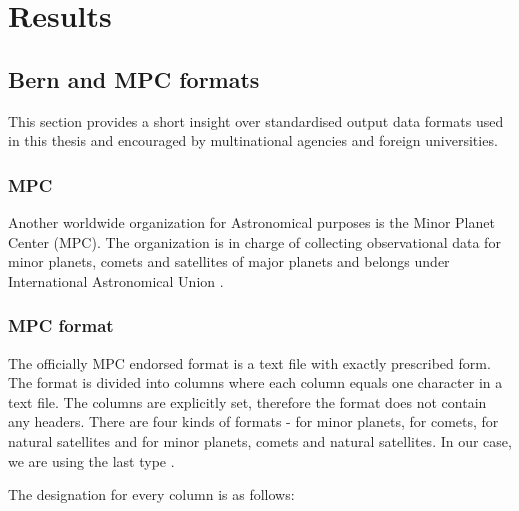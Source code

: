 \chapter{Results}\label{chap:results}

\section{Bern and MPC formats}\label{sec:tdm_ccsds}

	This section provides a short insight over standardised output data formats used in this thesis and encouraged by multinational agencies and foreign universities. 
		
\subsection{MPC}\label{sec:mpc}

	Another worldwide organization for Astronomical purposes is the Minor Planet Center (MPC). The organization is in charge of collecting observational data for minor planets, comets and satellites of major planets and belongs under International Astronomical Union \citep{mpc}.
	
\subsection{MPC format}

	The officially MPC endorsed format is a text file with exactly prescribed form. The format is divided into columns where each column equals one character in a text file. The columns are explicitly set, therefore the format does not contain any headers. There are four kinds of formats - for minor planets, for comets, for natural satellites and for minor planets, comets and natural satellites. In our case, we are using the last type \citep{mpc}.
	
	The designation for every column is as follows:
	
